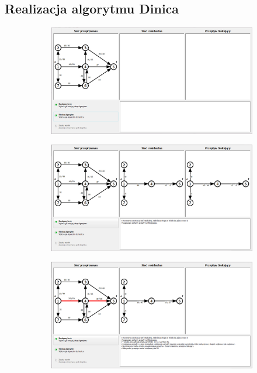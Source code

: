 \begin{appendices}
 	\chapter{Realizacja algorytmu Dinica}\label{add:dinicExample}
 	\setlength\intextsep{10pt}
 	\begin{figure}[H]
 		\centering
 		\begin{subfigure}{\textwidth}
 			\includegraphics[width=0.9\linewidth]{./img/dinic01.jpg}
 		\end{subfigure}\par\bigskip
 		\begin{subfigure}{\textwidth}
 			\includegraphics[width=0.9\linewidth]{./img/dinic02.jpg}
 		\end{subfigure}
 	\end{figure}
 	\begin{figure}
 		\ContinuedFloat
 		\begin{subfigure}{\textwidth}
 			\includegraphics[width=0.9\linewidth]{./img/dinic04.jpg}

\end{subfigure}
\end{figure}
\end{appendices}
